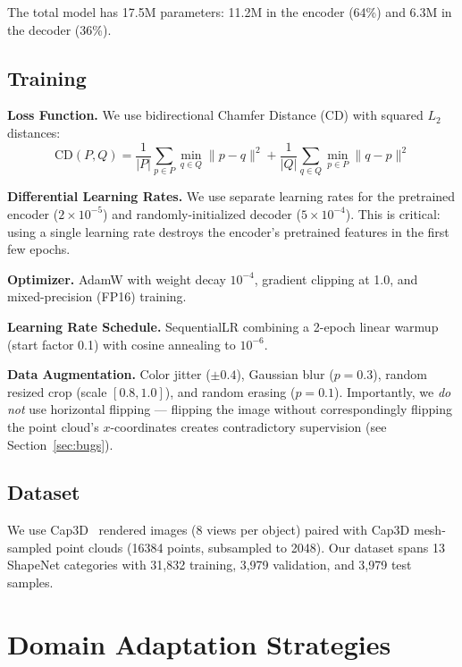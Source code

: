 \documentclass[10pt,twocolumn,letterpaper]{article}
\begin{document}
The total model has 17.5M parameters: 11.2M in the encoder (64\%) and 6.3M in the decoder (36\%).

\subsection{Training}

\textbf{Loss Function.} We use bidirectional Chamfer Distance (CD) with squared $L_2$ distances:
\begin{equation}
\text{CD}(P, Q) = \frac{1}{|P|}\sum_{p \in P} \min_{q \in Q} \|p-q\|^2 + \frac{1}{|Q|}\sum_{q \in Q} \min_{p \in P} \|q-p\|^2
\end{equation}

\textbf{Differential Learning Rates.} We use separate learning rates for the pretrained encoder ($2 \times 10^{-5}$) and randomly-initialized decoder ($5 \times 10^{-4}$).
This is critical: using a single learning rate destroys the encoder's pretrained features in the first few epochs.

\textbf{Optimizer.} AdamW with weight decay $10^{-4}$, gradient clipping at 1.0, and mixed-precision (FP16) training.

\textbf{Learning Rate Schedule.} SequentialLR combining a 2-epoch linear warmup (start factor 0.1) with cosine annealing to $10^{-6}$.

\textbf{Data Augmentation.} Color jitter ($\pm 0.4$), Gaussian blur ($p=0.3$), random resized crop (scale $[0.8, 1.0]$), and random erasing ($p=0.1$).
Importantly, we \emph{do not} use horizontal flipping --- flipping the image without correspondingly flipping the point cloud's $x$-coordinates creates contradictory supervision (see Section~\ref{sec:bugs}).

\subsection{Dataset}

We use Cap3D~\cite{luo2023scalable} rendered images (8 views per object) paired with Cap3D mesh-sampled point clouds (16384 points, subsampled to 2048).
Our dataset spans 13 ShapeNet categories with 31,832 training, 3,979 validation, and 3,979 test samples.

\section{Domain Adaptation Strategies}
\end{document}
